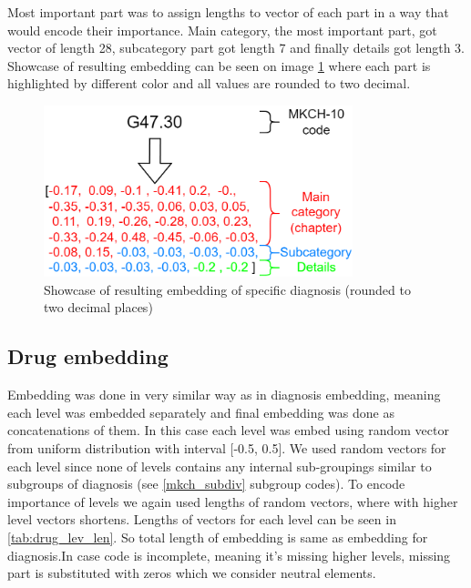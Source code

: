 Most important part was to assign lengths to vector of each part in a way that would encode their importance. 
Main category, the most important part, got vector of length 28, subcategory part got length 7 and finally details got length 3.
\\

Showcase of resulting embedding can be seen on image \ref{fig:diag_emb_show} where each part is highlighted by different color and all values are rounded to two decimal.

\begin{figure}[!h]
	\centering
	
	\includegraphics[width=0.8\textwidth]{images/diagnosis_embed_showcase.png} 
	
	\caption{Showcase of resulting embedding of specific diagnosis (rounded to two decimal places)}
	\label{fig:diag_emb_show}
\end{figure} 


\subsection{Drug embedding}

Embedding was done in very similar way as in diagnosis embedding, meaning each level was embedded separately and final embedding was done as concatenations of them. In this case each level was embed using random vector from uniform distribution with interval [-0.5, 0.5]. We used random vectors for each level since none of levels contains any internal sub-groupings similar to subgroups of diagnosis (see \ref{mkch_subdiv} subgroup codes). To encode importance of levels we again used lengths of random vectors, where with higher level vectors shortens. Lengths of vectors for each level can be seen in \ref{tab:drug_lev_len}. So total length of embedding is same as embedding for diagnosis.In case code is incomplete, meaning it's missing higher levels, missing part is substituted with zeros which we consider neutral elements.
\\

